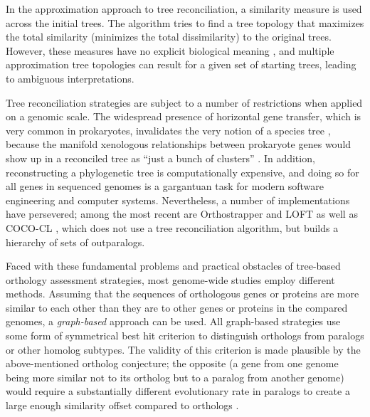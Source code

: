 

In the approximation approach to tree reconciliation, a similarity measure is
used across the initial trees. The algorithm tries to find a tree topology that
maximizes the total similarity (minimizes the total dissimilarity) to the
original trees. However, these measures have no explicit biological meaning
\citep{mirkin1995}, and multiple approximation tree topologies can result for a
given set of starting trees, leading to ambiguous interpretations. 

Tree reconciliation strategies are subject to a number of restrictions when
applied on a genomic scale. The widespread presence of horizontal gene transfer,
which is very common in prokaryotes, invalidates the very notion of a species
tree \citep{doolittle2000}, because the manifold xenologous relationships
between prokaryote genes would show up in a reconciled tree as ``just a bunch of
clusters'' . In addition, reconstructing a phylogenetic tree is
computationally expensive, and doing so for all genes in sequenced genomes is a
gargantuan task for modern software engineering and computer systems.
Nevertheless, a number of implementations have persevered; among the most recent
are Orthostrapper \citep{jothi2006} and LOFT \citep{van_der_heijden2007} as well
as \mbox{COCO-CL} \citep{storm2002}, which does not use a tree reconciliation
algorithm, but builds a hierarchy of sets of outparalogs. 

Faced with these fundamental problems and practical obstacles of tree-based
orthology assessment strategies, most genome-wide studies employ different
methods. Assuming that the sequences of orthologous genes or proteins are more
similar to each other than they are to other genes or proteins in the compared
genomes, a \emph{graph-based} approach can be used. All graph-based strategies
use some form of symmetrical best hit criterion to distinguish orthologs from
paralogs or other homolog subtypes. The validity of this criterion is made
plausible by the above-mentioned ortholog conjecture; the opposite (a gene from
one genome being more similar not to its ortholog but to a paralog from another
genome) would require a substantially different evolutionary rate in paralogs to
create a large enough similarity offset compared to orthologs \citep{koonin2005}.

